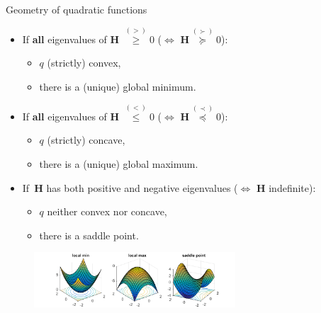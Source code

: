 \documentclass[11pt,compress,t,notes=noshow, xcolor=table]{beamer}
\begin{document}
\begin{vbframe}{Geometry of quadratic functions}
\begin{itemize}
    \item If \textbf{all} eigenvalues of $\mathbf{H}$ $\overset{(>)}{\geq} 0$ ($\Leftrightarrow$ $\mathbf{H} \overset{(\succ)}{\succcurlyeq} 0$):
        \begin{itemize} 
            \item $q$ (strictly) convex,
            \item there is a (unique) global minimum. 
        \end{itemize}
    \item If \textbf{all} eigenvalues of $\mathbf{H}$ $\overset{(<)}{\leq} 0$ ($\Leftrightarrow$ $\mathbf{H} \overset{(\prec)}{\preccurlyeq} 0$):
        \begin{itemize} 
            \item $q$ (strictly) concave,
            \item there is a (unique) global maximum. 
        \end{itemize}
    \item If~$\mathbf{H}$ has both positive and negative eigenvalues ($\Leftrightarrow$ $\mathbf{H}$ indefinite):
        \begin{itemize}
            \item $q$ neither convex nor concave,
            \item there is a saddle point.
        \end{itemize}
\end{itemize}


\begin{figure}
    \centering
    \includegraphics[width=0.67\textwidth]{figure_man/minmaxsaddle.png}
\end{figure}

\end{vbframe}
\end{document}
